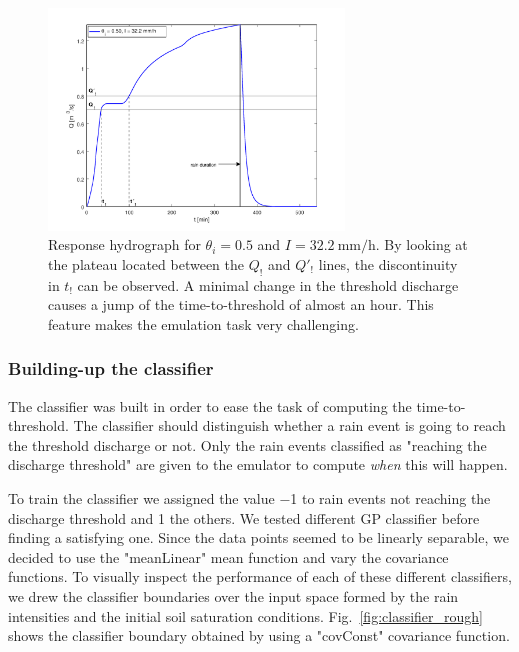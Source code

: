 \begin{figure}[h]
  \centering
  \includegraphics[width=0.7\textwidth]{Figures/hydrograph.png}
  \caption{Response hydrograph for $\theta_i = \num{0.5}$ and $I = \SI{32.2}{\milli\meter\per\hour}$. By looking at the plateau located between the $Q_!$ and $Q'_!$ lines, the discontinuity in $t_!$ can be observed. A minimal change in the threshold discharge causes a jump of the time-to-threshold of almost an hour. This feature makes the emulation task very challenging.}
  \label{fig:hydrograph}
\end{figure}

\subsubsection{Building-up the classifier}

The classifier was built in order to ease the task of computing the time-to-threshold.
The classifier should distinguish whether a rain event is going to reach the threshold discharge or not.
Only the rain events classified as "reaching the discharge threshold" are given to the emulator to compute \emph{when} this will happen.

To train the classifier we assigned the value \num{-1} to rain events not reaching the discharge threshold and \num{1} the others.  
We tested different GP classifier before finding a satisfying one.
Since the data points seemed to be linearly separable, we decided to use the "meanLinear" mean function and vary
the covariance functions.
To visually inspect the performance of each of these different classifiers, we drew the classifier boundaries over the input space formed by the rain intensities and the initial soil saturation conditions. Fig.~\ref{fig:classifier_rough} shows the classifier boundary obtained by using a "covConst" covariance function.

